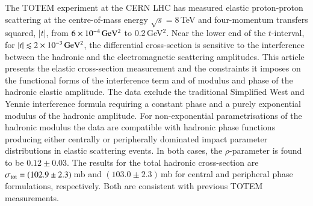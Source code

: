 The TOTEM experiment at the CERN LHC has measured elastic proton-proton 
scattering at the centre-of-mass energy 
$\sqrt{s}=8\,$TeV and four-momentum transfers squared, $|t|$, from $6\times10^{-4}\,\rm GeV^{2}$ to 0.2\,GeV$^{2}$.
Near the lower end of the $t$-interval, for
$|t| \lesssim 2\times10^{-3}\,\rm GeV^{2}$, the differential cross-section is 
sensitive to the 
interference between the hadronic and the electromagnetic scattering amplitudes.
This article presents the elastic cross-section measurement and the constraints it 
imposes on the functional forms of the interference term and of modulus and
phase of the hadronic elastic amplitude. The data exclude the traditional 
Simplified West and Yennie interference formula requiring a constant 
phase and a purely exponential modulus of the hadronic amplitude. 
For non-exponential parametrisations of the hadronic 
modulus the data are compatible with hadronic phase 
functions producing either centrally or peripherally dominated impact 
parameter distributions in elastic scattering events. In both cases, 
the $\rho$-parameter is found to be $0.12 \pm 0.03$. 
The results for the total hadronic 
cross-section are $\sigma_{\rm tot} = (102.9 \pm 2.3)$\,mb and 
$(103.0 \pm 2.3)$\,mb for central and peripheral phase formulations, 
respectively. Both are consistent with previous TOTEM measurements.
